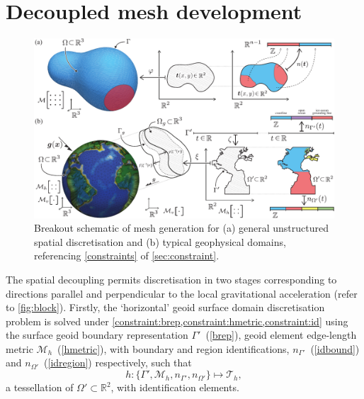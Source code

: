 \documentclass[a4paper, 10pt]{book}
\providecommand{\eqref}[1]{(\ref{#1})}
\begin{document}
\section{Decoupled mesh development}
\label{sec:decoupled}
%
\begin{figure}[!h]
\begin{center}
\includegraphics[width=\textwidth]{fig/breakout.pdf}
\end{center}
\vspace{-2.8ex}
\caption{Breakout schematic of mesh generation for
(a) general unstructured spatial discretisation
and
(b) typical geophysical domains,
referencing \cref{constraints} of \cref{sec:constraint}.
}
\label{fig:breakout}
\vspace{-2ex}
\end{figure}
%
The spatial decoupling permits discretisation in two stages
corresponding to directions parallel and perpendicular to the local gravitational acceleration (refer to \cref{fig:block}).
%
Firstly, the `horizontal' geoid surface domain discretisation problem is solved
%
under \cref{constraint:brep,constraint:hmetric,constraint:id}
using
the surface geoid boundary representation $\Gamma'$~\eqref{brep},
geoid element edge-length metric $\mathcal{M}_h$~\eqref{hmetric},
with
boundary and region identifications, 
$n_{\Gamma'}$~\eqref{idbound}
and
$n_{\Omega'}$~\eqref{idregion}
respectively,
such that
\begin{equation}
h\!: \{\Gamma', \mathcal{M}_h, n_{\Gamma'}, n_{\Omega'}\} \mapsto \mathcal{T}_h,
\label{h}
\end{equation}
a tessellation of $\Omega' \subset \mathbb{R}^2$, with identification elements.
\end{document}
